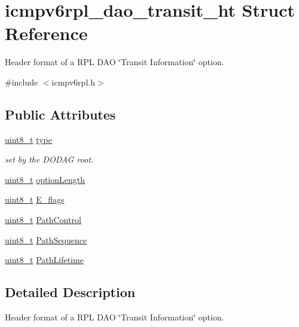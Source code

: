\hypertarget{structicmpv6rpl__dao__transit__ht}{}\section{icmpv6rpl\+\_\+dao\+\_\+transit\+\_\+ht Struct Reference}
\label{structicmpv6rpl__dao__transit__ht}


Header format of a R\+PL D\+AO \char`\"{}\+Transit Information\char`\"{} option.  




{\ttfamily \#include $<$icmpv6rpl.\+h$>$}

\subsection*{Public Attributes}
\begin{DoxyCompactItemize}
\item 
\hyperlink{_p_e___types_8h_aba7bc1797add20fe3efdf37ced1182c5}{uint8\+\_\+t} \hyperlink{structicmpv6rpl__dao__transit__ht_a6fde2b373c11770b5c55317c4a776ee4}{type}
\begin{DoxyCompactList}\small\item\em set by the D\+O\+D\+AG root. \end{DoxyCompactList}\item 
\hyperlink{_p_e___types_8h_aba7bc1797add20fe3efdf37ced1182c5}{uint8\+\_\+t} \hyperlink{structicmpv6rpl__dao__transit__ht_a4ce1e12d4aee1a20a166b70fbd83d1f0}{option\+Length}
\item 
\hyperlink{_p_e___types_8h_aba7bc1797add20fe3efdf37ced1182c5}{uint8\+\_\+t} \hyperlink{structicmpv6rpl__dao__transit__ht_a8d171440870fd3c2046746f796f66cde}{E\+\_\+flags}
\item 
\hyperlink{_p_e___types_8h_aba7bc1797add20fe3efdf37ced1182c5}{uint8\+\_\+t} \hyperlink{structicmpv6rpl__dao__transit__ht_a4570d3d6ae34cce8d05a4f1da1521696}{Path\+Control}
\item 
\hyperlink{_p_e___types_8h_aba7bc1797add20fe3efdf37ced1182c5}{uint8\+\_\+t} \hyperlink{structicmpv6rpl__dao__transit__ht_acb45c31db8e5133099a91e4e96e7cc78}{Path\+Sequence}
\item 
\hyperlink{_p_e___types_8h_aba7bc1797add20fe3efdf37ced1182c5}{uint8\+\_\+t} \hyperlink{structicmpv6rpl__dao__transit__ht_ad6f4184cf16bf1c50c9212f0c66dc7b5}{Path\+Lifetime}
\end{DoxyCompactItemize}


\subsection{Detailed Description}
Header format of a R\+PL D\+AO \char`\"{}\+Transit Information\char`\"{} option. 

